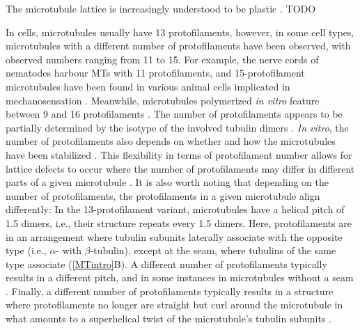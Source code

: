 The microtubule lattice is increasingly understood to be plastic \cite{Cross2019}. TODO

In cells, microtubules usually have 13 protofilaments, however, in some cell types, microtubules with a different number of protofilaments have been observed, with observed numbers ranging from 11 to 15. For example, the nerve cords of nematodes harbour MTs with 11 protofilaments, and 15-protofilament microtubules have been found in various animal cells implicated in mechanosensation \parencite{Chaaban2017}. Meanwhile, microtubules polymerized \textit{in vitro} feature between 9 and 16 protofilaments \parencite{Chaaban2017}. The number of protofilaments appears to be partially determined by the isotype of the involved tubulin dimers \parencite{Ti2018}. \textit{In vitro}, the number of protofilaments also depends on whether and how the microtubules have been stabilized . This flexibility in terms of protofilament number allows for lattice defects to occur where the number of protofilaments may differ in different parts of a given microtubule . It is also worth noting that depending on the number of protofilaments, the protofilaments in a given microtubule align differently: In the 13-protofilament variant, microtubules have a helical pitch of 1.5 dimers, i.e., their structure repeats every 1.5 dimers. Here, protofilaments are in an arrangement where tubulin subunits laterally associate with the opposite type (i.e., $\alpha$- with $\beta$-tubulin), except at the seam, where tubulins of the same type associate (\autoref{MTintro}B). A different number of protofilaments typically results in a different pitch, and in some instances in microtubules without a seam . Finally, a different number of protofilaments typically results in a structure where protofilaments no longer are straight but curl around the microtubule in what amounts to a superhelical twist of the microtubule's tubulin subunits \parencite{Chaaban2017}.

